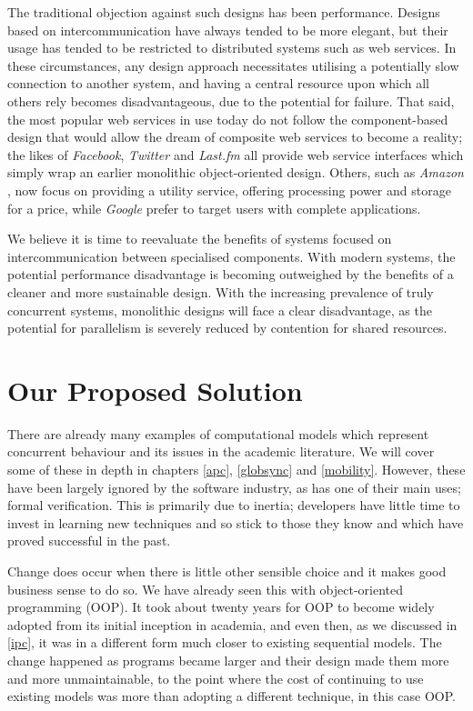 The traditional objection against such designs has been performance.
Designs based on intercommunication have always tended to be more
elegant, but their usage has tended to be restricted to distributed
systems such as web services.  In these circumstances, any design
approach necessitates utilising a potentially slow connection to
another system, and having a central resource upon which all others
rely becomes disadvantageous, due to the potential for failure.  That
said, the most popular web services in use today do not follow the
component-based design that would allow the dream of composite web
services \cite{cashews-sem} to become a reality; the likes of
\emph{Facebook}, \emph{Twitter} and \emph{Last.fm}
\cite{facebook,twitter,lastfm} all provide web service
interfaces which simply wrap an earlier monolithic object-oriented
design.  Others, such as \emph{Amazon} \cite{amazon}, now focus on
providing a utility service, offering processing power and storage for
a price, while \emph{Google} \cite{google} prefer to target users with
complete applications.

We believe it is time to reevaluate the benefits of systems focused on
intercommunication between specialised components.  With modern
systems, the potential performance disadvantage is becoming outweighed
by the benefits of a cleaner and more sustainable design.  With the
increasing prevalence of truly concurrent systems, monolithic designs
will face a clear disadvantage, as the potential for parallelism is
severely reduced by contention for shared resources.

\section{Our Proposed Solution}
\label{solution}

There are already many examples of computational models which
represent concurrent behaviour and its issues in the academic
literature.  We will cover some of these in depth in chapters
\ref{apc}, \ref{globsync} and \ref{mobility}.  However, these have
been largely ignored by the software industry, as has one of their
main uses; formal verification.  This is primarily due to inertia;
developers have little time to invest in learning new techniques and
so stick to those they know and which have proved successful in the
past.

Change does occur when there is little other sensible choice and it
makes good business sense to do so.  We have already seen this with
object-oriented programming (OOP). It took about twenty years for OOP
to become widely adopted from its initial inception in academia, and
even then, as we discussed in \ref{ipc}, it was in a different form
much closer to existing sequential models.  The change happened as
programs became larger and their design made them more and more
unmaintainable, to the point where the cost of continuing to use
existing models was more than adopting a different technique, in this
case OOP.

